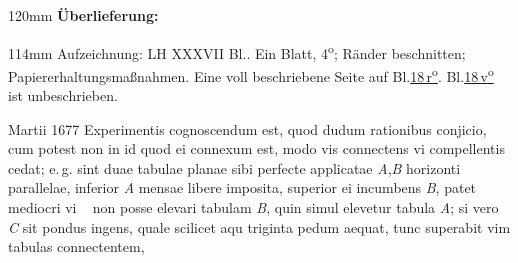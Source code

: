 %
\frenchspacing%
\begin{ledgroupsized}[r]{120mm}%
\footnotesize%
\pstart%
\noindent\textbf{Überlieferung:}%
\pend%
\end{ledgroupsized}%
\begin{ledgroupsized}[r]{114mm}%
\footnotesize%
\pstart%
\parindent -6mm%
%
Aufzeichnung:
LH XXXVII Bl..
Ein Blatt, 4\textsuperscript{o};
Ränder beschnitten;
Papiererhaltungsmaßnahmen.
Eine voll beschriebene Seite auf Bl.\;\href{\Scan{LH_37_05_018r}}{18\,r\textsuperscript{o}}.
Bl.\;\href{\Scan{LH_37_05_018v}}{18\,v\textsuperscript{o}} ist unbeschrieben.
\pend%
\end{ledgroupsized}%
%
\frenchspacing%
\vspace{8mm}%
\normalsize%
\pstart%
\noindent%
%
\hfill%
%
Martii 1677%
%
\pend%
\pstart%
\noindent%
Experimentis%
cognoscendum est,%
quod dudum rationibus%
conjicio,
cum potest non in id
quod ei connexum est,
modo vis connectens%
vi compellentis cedat;%
e.\,g.
sint duae
tabulae planae%
sibi perfecte applicatae%
\textit{A},\;\textit{B} %
horizonti parallelae,
inferior \textit{A} mensae libere imposita,%
superior ei incumbens \textit{B},
patet
mediocri vi%
%
~%
non posse elevari tabulam \textit{B},
quin simul elevetur tabula \textit{A};
si vero \textit{C} sit pondus ingens,%
quale scilicet aqu%
triginta pedum%
%
aequat,
tunc superabit vim tabulas connectentem,%
%
